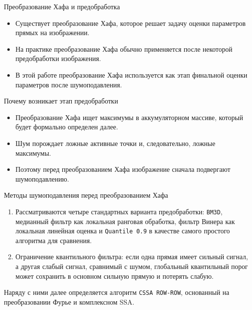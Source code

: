 \documentclass[unicode,notheorems]{beamer}
\begin{document}
\begin{frame}{Преобразование Хафа и предобработка}
	\begin{itemize}
		\item Существует преобразование Хафа, которое решает задачу оценки параметров прямых на изображении.
		\item На практике преобразование Хафа обычно применяется после некоторой предобработки изображения.
		\item В этой работе преобразование Хафа используется как этап финальной оценки параметров после шумоподавления.
	\end{itemize}

	\vspace{0.25cm}
	\begin{block}{Почему возникает этап предобработки}
		\begin{itemize}
			\item Преобразование Хафа ищет максимумы в аккумуляторном массиве, который будет формально определен далее.
			\item Шум порождает ложные активные точки и, следовательно, ложные максимумы.
			\item Поэтому перед преобразованием Хафа изображение сначала подвергают шумоподавлению.
		\end{itemize}
	\end{block}
\end{frame}

\begin{frame}{Методы шумоподавления перед преобразованием Хафа}
	\small
	\begin{enumerate}
		\item Рассматриваются четыре стандартных варианта предобработки: \texttt{BM3D}, медианный фильтр как локальная ранговая обработка, фильтр Винера как локальная линейная оценка и \texttt{Quantile 0.9} в качестве самого простого алгоритма для сравнения.
		\item Ограничение квантильного фильтра: если одна прямая имеет сильный сигнал, а другая слабый сигнал, сравнимый с шумом, глобальный квантильный порог может сохранить в основном сильную прямую и потерять слабую.
	\end{enumerate}

	\vspace{0.2cm}
	Наряду с ними далее определяется алгоритм \texttt{CSSA ROW-ROW}, основанный на преобразовании Фурье и комплексном SSA.
\end{frame}
\end{document}
